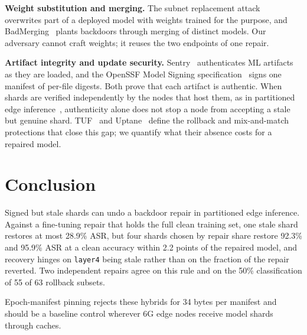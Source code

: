 \documentclass[conference,a4paper]{IEEEtran}  %
\newcommand{\todo}[1]{\textcolor{red}{[TODO: #1]}}
\newif\ifincludeanp      \includeanpfalse   %
\begin{document}
\textbf{Weight substitution and merging.} The subnet replacement
attack~\cite{qi2022subnet} overwrites part of a deployed model with
weights trained for the purpose, and BadMerging~\cite{zhang2024badmerging}
plants backdoors through merging of distinct models. Our adversary cannot craft weights; it reuses the two endpoints of one repair.

\textbf{Artifact integrity and update security.}
Sentry~\cite{gan2025sentry} authenticates ML artifacts as they are loaded,
and the OpenSSF Model Signing specification~\cite{oms2025} signs one
manifest of per-file digests. Both prove that each artifact is authentic.
When shards are verified independently by the nodes that host them, as in
partitioned edge inference~\cite{kang2017neurosurgeon,letaief2022edgeai6g},
authenticity alone does not stop a node from accepting a stale but genuine
shard. TUF~\cite{tuf} and Uptane~\cite{uptane} define the rollback and
mix-and-match protections that close this gap; we quantify what their
absence costs for a repaired model.

\section{Conclusion}
\label{sec:conclusion}

Signed but stale shards can undo a backdoor repair in partitioned edge
inference. Against a fine-tuning repair that holds the full clean training set,
one stale shard restores at most 28.9\% ASR, but four shards chosen by repair
share restore 92.3\% and 95.9\% ASR at a clean accuracy within 2.2 points of
the repaired model, and recovery hinges on \texttt{layer4} being stale rather
than on the fraction of the repair reverted. Two independent repairs agree on
this rule and on the 50\% classification of 55 of 63 rollback subsets.
\ifincludeanp \todo{One sentence on ANP.} \fi
Epoch-manifest pinning rejects these hybrids for 34 bytes per manifest and
should be a baseline control wherever 6G edge nodes receive model shards
through caches.



\end{document}
